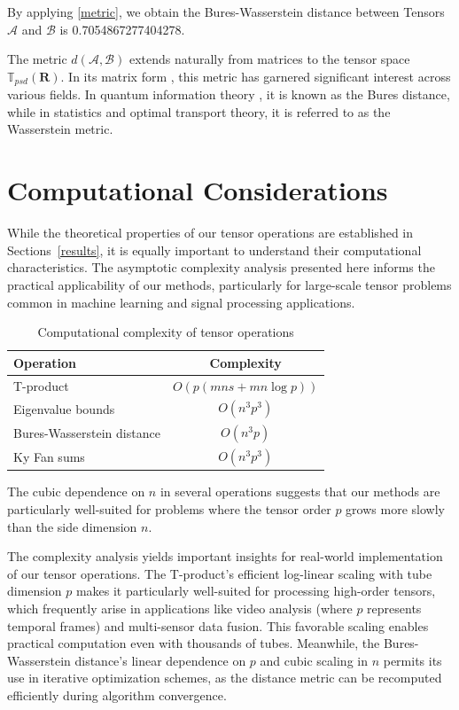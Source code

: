 \documentclass[oupthm]{CUP-JNL-BCM}%
\theoremstyle{oupplain}
\theoremstyle{oupdefinition}
\theoremstyle{oupremark}
\theoremstyle{oupproof}
\numberwithin{equation}{section}
\begin{document}
\noindent By applying \eqref{metric}, we obtain the Bures-Wasserstein distance between Tensors $\mathcal{A}$ and $\mathcal{B}$ is 0.7054867277404278.





The metric $d(\mathcal{A}, \mathcal{B})$ extends naturally from matrices to the tensor space $\mathbb{T}_{psd}(\mathbf{R})$. In its matrix form \cite{bures}, this metric has garnered significant interest across various fields. In quantum information theory \cite{buresquant}, it is known as the Bures distance, while in statistics and optimal transport theory, it is referred to as the Wasserstein metric. 

\section{Computational Considerations}
\label{sec:complexity}

While the theoretical properties of our tensor operations are established in Sections~\ref{results}, it is equally important to understand their computational characteristics. The asymptotic complexity analysis presented here informs the practical applicability of our methods, particularly for large-scale tensor problems common in machine learning and signal processing applications.

\begin{table}[t]
\centering
\caption{Computational complexity of tensor operations}
\label{tab:complexity}
\begin{tabular}{lc}
\hline
Operation & Complexity \\
\hline
T-product & $O(p(mns + mn \log p))$ \\
Eigenvalue bounds & $O(n^3p^3)$ \\
Bures-Wasserstein distance & $O(n^3p)$ \\
Ky Fan sums & $O(n^3p^3)$ \\
\hline
\end{tabular}
\end{table}

The cubic dependence on $n$ in several operations suggests that our methods are particularly well-suited for problems where the tensor order $p$ grows more slowly than the side dimension $n$. 

The complexity analysis yields important insights for real-world implementation of our tensor operations. The T-product's efficient log-linear scaling with tube dimension $p$ makes it particularly well-suited for processing high-order tensors, which frequently arise in applications like video analysis (where $p$ represents temporal frames) and multi-sensor data fusion. This favorable scaling enables practical computation even with thousands of tubes. Meanwhile, the Bures-Wasserstein distance's linear dependence on $p$ and cubic scaling in $n$ permits its use in iterative optimization schemes, as the distance metric can be recomputed efficiently during algorithm convergence.
\end{document}
